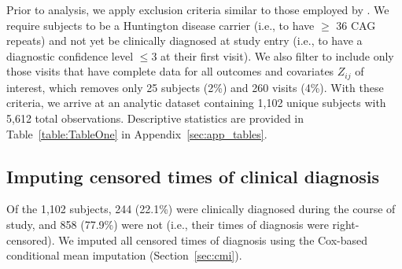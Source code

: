 \documentclass[12pt]{article}
\begin{document}
Prior to analysis, we apply exclusion criteria similar to those employed by \cite{long2017validation}. We require subjects to be a Huntington disease carrier (i.e., to have $\geq$ 36 CAG repeats) and not yet 
be clinically diagnosed at study entry (i.e., to have a diagnostic confidence level $\leq 3$ at their first visit). We also filter to include only those visits that have complete data for all outcomes and covariates $Z_{ij}$ of interest, which removes only 25 subjects (2\%) and 260 visits (4\%). %
With these criteria, we arrive at an analytic dataset containing 1,102 unique subjects with 5,612 total observations. Descriptive statistics are provided in Table~\ref{table:TableOne} in Appendix~\ref{sec:app_tables}.

\subsection{Imputing censored times of clinical diagnosis}
\label{sec:real_data_cmi}
Of the 1,102 subjects, 244 (22.1\%) were clinically diagnosed during the course of study, and 858 (77.9\%) were not (i.e., their times of diagnosis were right-censored). We imputed all censored times of diagnosis using the Cox-based conditional mean imputation (Section~\ref{sec:cmi}).
\end{document}
